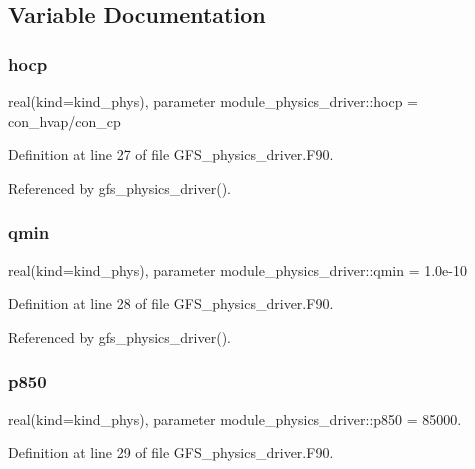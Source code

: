 \subsection{Variable Documentation}
\mbox{\label{namespacemodule__physics__driver_a39e15d5d87b9ff963c2f6a6a8c88f2f2}} 
\subsubsection{hocp}
{\footnotesize\ttfamily real(kind=kind\+\_\+phys), parameter module\+\_\+physics\+\_\+driver\+::hocp = con\+\_\+hvap/con\+\_\+cp}



Definition at line 27 of file G\+F\+S\+\_\+physics\+\_\+driver.\+F90.



Referenced by gfs\+\_\+physics\+\_\+driver().

\mbox{\label{namespacemodule__physics__driver_a21d821aa7850dfcdaae562fe52b37c7b}} 
\subsubsection{qmin}
{\footnotesize\ttfamily real(kind=kind\+\_\+phys), parameter module\+\_\+physics\+\_\+driver\+::qmin = 1.\+0e-\/10}



Definition at line 28 of file G\+F\+S\+\_\+physics\+\_\+driver.\+F90.



Referenced by gfs\+\_\+physics\+\_\+driver().

\mbox{\label{namespacemodule__physics__driver_a6df39593461d81766b8dace13a111ce2}} 
\subsubsection{p850}
{\footnotesize\ttfamily real(kind=kind\+\_\+phys), parameter module\+\_\+physics\+\_\+driver\+::p850 = 85000.}



Definition at line 29 of file G\+F\+S\+\_\+physics\+\_\+driver.\+F90.



